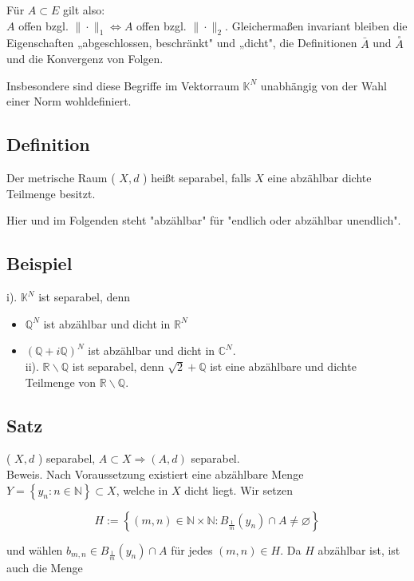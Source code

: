 \documentclass[10pt, letterpaper]{article}
\begin{document}
Für $A \subset E$ gilt also:\\
$A$ offen bzgl. $\|\cdot\|_{1} \Longleftrightarrow A$ offen bzgl. $\|\cdot\|_{2}$. Gleichermaßen invariant bleiben die Eigenschaften „abgeschlossen, beschränkt" und „dicht", die Definitionen $\bar{A}$ und $\stackrel{\circ}{A}$ und die Konvergenz von Folgen.

Insbesondere sind diese Begriffe im Vektorraum $\mathbb{K}^{N}$ unabhängig von der Wahl einer Norm wohldefiniert.

\subsection*{Definition}
Der metrische Raum ( $X, d$ ) heißt separabel, falls $X$ eine abzählbar dichte Teilmenge besitzt.

Hier und im Folgenden steht "abzählbar" für "endlich oder abzählbar unendlich".

\subsection*{Beispiel}
i). $\mathbb{K}^{N}$ ist separabel, denn

\begin{itemize}
  \item $\mathbb{Q}^{N}$ ist abzählbar und dicht in $\mathbb{R}^{N}$
  \item $(\mathbb{Q}+i \mathbb{Q})^{N}$ ist abzählbar und dicht in $\mathbb{C}^{N}$.\\
ii). $\mathbb{R} \backslash \mathbb{Q}$ ist separabel, denn $\sqrt{2}+\mathbb{Q}$ ist eine abzählbare und dichte Teilmenge von $\mathbb{R} \backslash \mathbb{Q}$.
\end{itemize}

\subsection*{Satz}
( $X, d$ ) separabel, $A \subset X \Longrightarrow(A, d)$ separabel.\\
Beweis. Nach Voraussetzung existiert eine abzählbare Menge $Y=\left\{y_{n}: n \in \mathbb{N}\right\} \subset X$, welche in $X$ dicht liegt. Wir setzen

$$
H:=\left\{(m, n) \in \mathbb{N} \times \mathbb{N}: B_{\frac{1}{m}}\left(y_{n}\right) \cap A \neq \varnothing\right\}
$$

und wählen $b_{m, n} \in B_{\frac{1}{m}}\left(y_{n}\right) \cap A$ für jedes $(m, n) \in H$. Da $H$ abzählbar ist, ist auch die Menge
\end{document}
